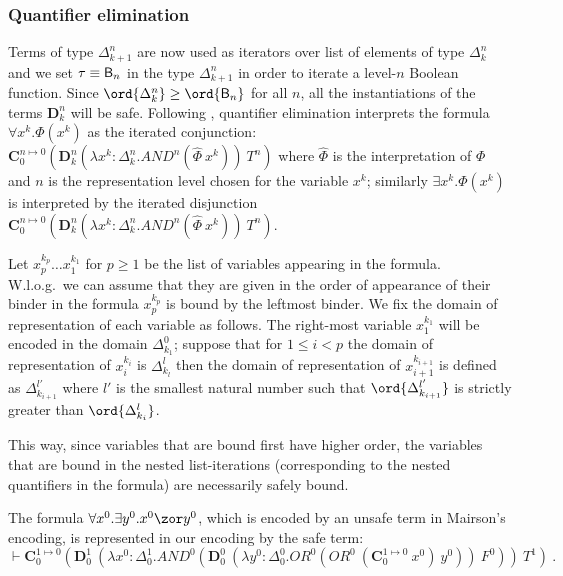 \subsubsection{Quantifier elimination}
Terms of type $\Delta_{k+1}^n$ are now used as iterators over list of elements of type $\Delta_k^n$ and we set $\tau \equiv \mathsf{B}_n$ in the type $\Delta_{k+1}^n$ in order to iterate a level-$n$ Boolean function. Since $\ord{\Delta_k^n} \geq \ord{\booltype_n}$ for all $n$, all the instantiations of the terms $\mathbf{D}_k^n$ will be safe. Following \cite{mairson1992spt}, quantifier elimination interprets the formula $\forall x^k.\Phi(x^k)$ as the iterated conjunction:
$\mathbf{C}_0^{n\mapsto 0} \left( \mathbf{D}_k^n(\lambda x^k:\Delta_k^n.AND^n(\hat\Phi~x^k))~T^n \right)$ where $\hat\Phi$ is the interpretation of $\Phi$
and $n$ is the representation level chosen for the variable $x^k$; similarly $\exists x^k.\Phi(x^k)$  is interpreted by the iterated disjunction $\mathbf{C}_0^{n\mapsto 0} \left( \mathbf{D}_k^n(\lambda x^k:\Delta_k^n.AND^n(\hat\Phi~x^k))~T^n\right)$.

Let $x^{k_p}_p \ldots x^{k_1}_1$ for $p\geq1$ be the list of variables appearing in the formula. W.l.o.g.\ we can assume that they are given in the order of appearance of their binder in the formula \ie $x^{k_p}_p$ is bound by the leftmost binder. We fix the domain of representation of each variable as follows. The right-most variable $x^{k_1}_1$ will be encoded in the domain $\Delta^0_{k_1}$; suppose that for $1\leq i< p$ the domain of representation of $x^{k_i}_i$ is $\Delta^l_{k_l}$ then the domain of representation of $x^{k_{i+1}}_{i+1}$ is defined as
$\Delta^{l'}_{k_{i+1}}$ where $l'$ is the smallest natural number such that $\ord{\Delta^{l'}_{k_{i+1}}}$ is strictly greater than $\ord{\Delta^{l}_{k_i}}$.

This way, since variables that are bound first have higher order, the variables that are bound in the nested list-iterations (corresponding to the nested quantifiers in the formula) are necessarily safely bound.

\begin{example}
The formula  $\forall x^0 . \exists y^0 . x^0 \zor y^0$, which is
encoded by an unsafe term in Mairson's encoding, is represented in
our encoding by the safe term:
 $$\vdash \mathbf{C}_0^{1\mapsto 0} \left( \mathbf{D}_0^1~(\lambda x^0:\Delta_0^1. AND^0 ( \mathbf{D}_0^0 ~(\lambda y^0:\Delta_0^0. OR^0 (OR^0~(\mathbf{C}_0^{1\mapsto 0}~x^0)~y^0))~F^0))~T^1 \right)\ .$$
\end{example}


